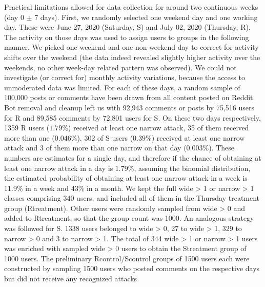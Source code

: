 \documentclass[a4paper,fleqn]{cas-dc}
\begin{document}
Practical limitations allowed for data collection for  around two continuous weeks (day 0 $\pm$ 7 days). First, we randomly selected one weekend day and one working day. These were June 27, 2020 (Saturday, \textsf{S}) and July 02, 2020 (Thursday, \textsf{R}). The activity on those days was used to   assign users to groups in the following manner. We picked one weekend and one non-weekend day to correct for activity shifts over the weekend (the data indeed revealed slightly higher activity over the weekends, no other week-day related pattern was observed). We could not investigate (or correct for) monthly activity variations, because the access to unmoderated data was limited.   For each of these days, a random sample of 100,000 posts or comments have been drawn from all content posted on \textsf{Reddit}.  Bot removal and cleanup  left us with  92,943 comments or posts by 75,516 users  for \textsf{R} and 89,585 comments by 72,801 users  for \textsf{S}.   On these two  days respectively,  1359 \textsf{R} users ($1.79\%$) received at least one \textsf{narrow} attack, 35 of them received more than one ($0.046\%$). 302 of \textsf{S} users ($0.39\%$) received at least one \textsf{narrow} attack and 3 of them more than one \textsf{narrow} on that day ($0.003\%$). These numbers  are estimates for a single day, and therefore if the chance of obtaining at least one \textsf{narrow} attack in a day is $1.79\%$, assuming the binomial distribution, the estimated probability of obtaining at least one \textsf{narrow} attack in a week is 11.9\% in a week and 43\% in a month. We kept the full  \textsf{wide > 1} or \textsf{narrow > 1} classes comprising 340 users, and  included all of them in the Thursday treatment group (\textsf{Rtreatment}). Other users were randomly sampled from \textsf{wide > 0} and added to \textsf{Rtreatment}, so that the group count was 1000. An analogous strategy was followed for \textsf{S}. 1338 users belonged to \textsf{wide > 0}, 27 to \textsf{wide > 1}, 329 to \textsf{narrow > 0} and 3 to \textsf{narrow > 1}. The total of 344 \textsf{wide > 1} or \textsf{narrow > 1} users was enriched with sampled \textsf{wide > 0} users to obtain the \textsf{Streatment} group of 1000 users.  The preliminary \textsf{Rcontrol}/\textsf{Scontrol}  groups of 1500 users each were constructed by sampling 1500 users who posted comments on the respective days but did not receive any recognized attacks. 
\end{document}
